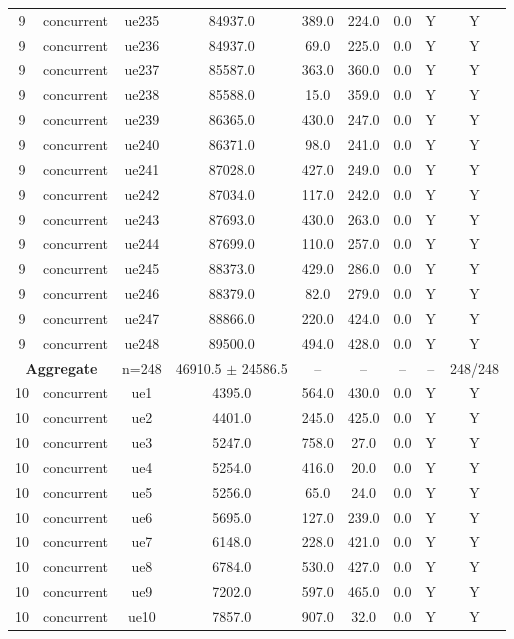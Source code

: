 \begin{table}[ht]
\begin{tabular}{|c|c|c|c|c|c|c|c|c|}
9 & concurrent & ue235 & 84937.0 & 389.0 & 224.0 & 0.0 & Y & Y \\
9 & concurrent & ue236 & 84937.0 & 69.0 & 225.0 & 0.0 & Y & Y \\
9 & concurrent & ue237 & 85587.0 & 363.0 & 360.0 & 0.0 & Y & Y \\
9 & concurrent & ue238 & 85588.0 & 15.0 & 359.0 & 0.0 & Y & Y \\
9 & concurrent & ue239 & 86365.0 & 430.0 & 247.0 & 0.0 & Y & Y \\
9 & concurrent & ue240 & 86371.0 & 98.0 & 241.0 & 0.0 & Y & Y \\
9 & concurrent & ue241 & 87028.0 & 427.0 & 249.0 & 0.0 & Y & Y \\
9 & concurrent & ue242 & 87034.0 & 117.0 & 242.0 & 0.0 & Y & Y \\
9 & concurrent & ue243 & 87693.0 & 430.0 & 263.0 & 0.0 & Y & Y \\
9 & concurrent & ue244 & 87699.0 & 110.0 & 257.0 & 0.0 & Y & Y \\
9 & concurrent & ue245 & 88373.0 & 429.0 & 286.0 & 0.0 & Y & Y \\
9 & concurrent & ue246 & 88379.0 & 82.0 & 279.0 & 0.0 & Y & Y \\
9 & concurrent & ue247 & 88866.0 & 220.0 & 424.0 & 0.0 & Y & Y \\
9 & concurrent & ue248 & 89500.0 & 494.0 & 428.0 & 0.0 & Y & Y \\
\multicolumn{2}{|c|}{\textbf{Aggregate}} & n=248 & 46910.5 $\pm$ 24586.5 & -- & -- & -- & -- & 248/248 \\
\hline
10 & concurrent & ue1 & 4395.0 & 564.0 & 430.0 & 0.0 & Y & Y \\
10 & concurrent & ue2 & 4401.0 & 245.0 & 425.0 & 0.0 & Y & Y \\
10 & concurrent & ue3 & 5247.0 & 758.0 & 27.0 & 0.0 & Y & Y \\
10 & concurrent & ue4 & 5254.0 & 416.0 & 20.0 & 0.0 & Y & Y \\
10 & concurrent & ue5 & 5256.0 & 65.0 & 24.0 & 0.0 & Y & Y \\
10 & concurrent & ue6 & 5695.0 & 127.0 & 239.0 & 0.0 & Y & Y \\
10 & concurrent & ue7 & 6148.0 & 228.0 & 421.0 & 0.0 & Y & Y \\
10 & concurrent & ue8 & 6784.0 & 530.0 & 427.0 & 0.0 & Y & Y \\
10 & concurrent & ue9 & 7202.0 & 597.0 & 465.0 & 0.0 & Y & Y \\
10 & concurrent & ue10 & 7857.0 & 907.0 & 32.0 & 0.0 & Y & Y \\

\end{tabular}
\end{table}
